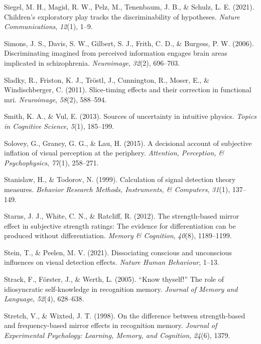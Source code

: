 \documentclass[12pt,twoside]{reedthesis}
\begin{document}
\leavevmode\hypertarget{ref-siegel2021children}{}%
Siegel, M. H., Magid, R. W., Pelz, M., Tenenbaum, J. B., \& Schulz, L. E. (2021). Children's exploratory play tracks the discriminability of hypotheses. \emph{Nature Communications}, \emph{12}(1), 1--9.

\leavevmode\hypertarget{ref-simons2006discriminating}{}%
Simons, J. S., Davis, S. W., Gilbert, S. J., Frith, C. D., \& Burgess, P. W. (2006). Discriminating imagined from perceived information engages brain areas implicated in schizophrenia. \emph{Neuroimage}, \emph{32}(2), 696--703.

\leavevmode\hypertarget{ref-sladky2011slice}{}%
Sladky, R., Friston, K. J., Tröstl, J., Cunnington, R., Moser, E., \& Windischberger, C. (2011). Slice-timing effects and their correction in functional mri. \emph{Neuroimage}, \emph{58}(2), 588--594.

\leavevmode\hypertarget{ref-smith2013sources}{}%
Smith, K. A., \& Vul, E. (2013). Sources of uncertainty in intuitive physics. \emph{Topics in Cognitive Science}, \emph{5}(1), 185--199.

\leavevmode\hypertarget{ref-solovey2015decisional}{}%
Solovey, G., Graney, G. G., \& Lau, H. (2015). A decisional account of subjective inflation of visual perception at the periphery. \emph{Attention, Perception, \& Psychophysics}, \emph{77}(1), 258--271.

\leavevmode\hypertarget{ref-stanislaw1999calculation}{}%
Stanislaw, H., \& Todorov, N. (1999). Calculation of signal detection theory measures. \emph{Behavior Research Methods, Instruments, \& Computers}, \emph{31}(1), 137--149.

\leavevmode\hypertarget{ref-starns2012strength}{}%
Starns, J. J., White, C. N., \& Ratcliff, R. (2012). The strength-based mirror effect in subjective strength ratings: The evidence for differentiation can be produced without differentiation. \emph{Memory \& Cognition}, \emph{40}(8), 1189--1199.

\leavevmode\hypertarget{ref-stein2021dissociating}{}%
Stein, T., \& Peelen, M. V. (2021). Dissociating conscious and unconscious influences on visual detection effects. \emph{Nature Human Behaviour}, 1--13.

\leavevmode\hypertarget{ref-strack2005know}{}%
Strack, F., Förster, J., \& Werth, L. (2005). ``Know thyself!'' The role of idiosyncratic self-knowledge in recognition memory. \emph{Journal of Memory and Language}, \emph{52}(4), 628--638.

\leavevmode\hypertarget{ref-stretch1998difference}{}%
Stretch, V., \& Wixted, J. T. (1998). On the difference between strength-based and frequency-based mirror effects in recognition memory. \emph{Journal of Experimental Psychology: Learning, Memory, and Cognition}, \emph{24}(6), 1379.
\end{document}
